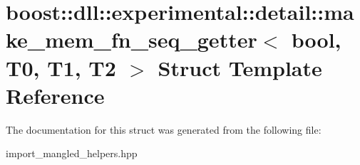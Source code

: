 \hypertarget{a00203}{}\section{boost\+:\+:dll\+:\+:experimental\+:\+:detail\+:\+:make\+\_\+mem\+\_\+fn\+\_\+seq\+\_\+getter$<$ bool, T0, T1, T2 $>$ Struct Template Reference}
\label{a00203}


The documentation for this struct was generated from the following file\+:\begin{DoxyCompactItemize}
\item 
import\+\_\+mangled\+\_\+helpers.\+hpp\end{DoxyCompactItemize}
